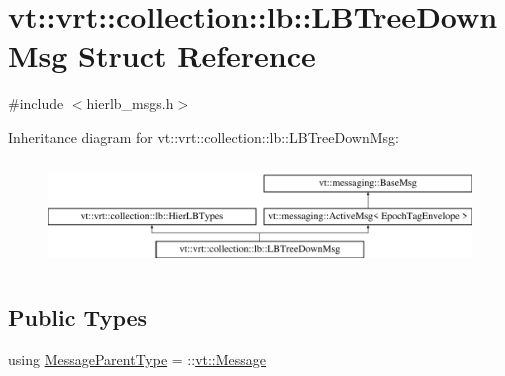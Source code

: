 \hypertarget{structvt_1_1vrt_1_1collection_1_1lb_1_1_l_b_tree_down_msg}{}\section{vt\+:\+:vrt\+:\+:collection\+:\+:lb\+:\+:L\+B\+Tree\+Down\+Msg Struct Reference}
\label{structvt_1_1vrt_1_1collection_1_1lb_1_1_l_b_tree_down_msg}


{\ttfamily \#include $<$hierlb\+\_\+msgs.\+h$>$}

Inheritance diagram for vt\+:\+:vrt\+:\+:collection\+:\+:lb\+:\+:L\+B\+Tree\+Down\+Msg\+:\begin{figure}[H]
\begin{center}
\leavevmode
\includegraphics[height=2.847458cm]{structvt_1_1vrt_1_1collection_1_1lb_1_1_l_b_tree_down_msg}
\end{center}
\end{figure}
\subsection*{Public Types}
\begin{DoxyCompactItemize}
\item 
using \hyperlink{structvt_1_1vrt_1_1collection_1_1lb_1_1_l_b_tree_down_msg_a519ac9259e7e931d2ec529c73917cc56}{Message\+Parent\+Type} = \+::\hyperlink{namespacevt_a3a3ddfef40b4c90915fa43cdd5f129ea}{vt\+::\+Message}
\end{DoxyCompactItemize}
